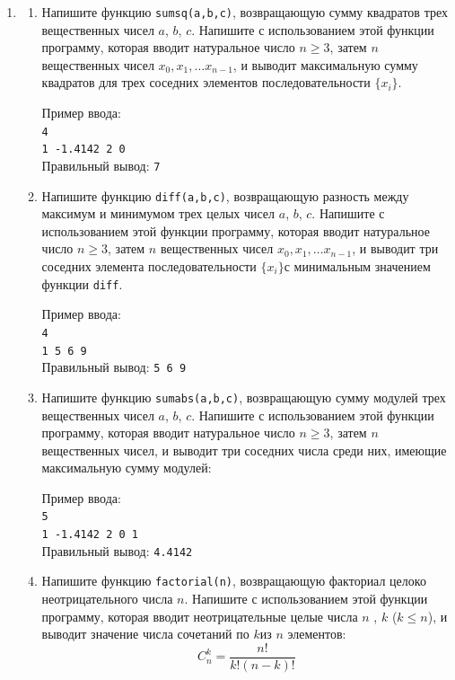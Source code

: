 \documentclass{article}
\newcommand{\textex}[1]{\texttt{\color{ForestGreen}#1}}
\begin{document}
\begin{enumerate}[label={}, leftmargin=0pt, itemindent=0pt]

\item

\begin{enumerate}[label=\arabic{enumi}.\arabic*.] %
\item
Напишите функцию \texttt{sumsq(a,b,c)}, возвращающую сумму квадратов трех вещественных чисел $a$, $b$, $c$. Напишите с использованием этой функции программу, которая вводит натуральное число $n\geqslant 3$, затем $n$ вещественных чисел $x_0, x_1, \ldots x_{n-1}$, и выводит максимальную сумму квадратов для трех соседних элементов последовательности $\{x_i\}$.

\noindent Пример ввода: \\
\textex{4\\
1 -1.4142 2 0}\\
Правильный вывод: \textex{7}

\item
Напишите функцию \texttt{diff(a,b,c)}, возвращающую разность между максимум и минимумом трех целых чисел $a$, $b$, $c$. Напишите с использованием этой функции программу, которая вводит натуральное число $n\geqslant 3$, затем $n$ вещественных чисел $x_0, x_1, \ldots x_{n-1}$, и выводит три соседних элемента последовательности $\{x_i\}$с минимальным значением функции \texttt{diff}.

\noindent Пример ввода: \\
\textex{4\\
1 5 6 9}\\
Правильный вывод: \textex{5 6 9}

\item
Напишите функцию \texttt{sumabs(a,b,c)}, возвращающую сумму модулей трех вещественных чисел $a$, $b$, $c$. Напишите с использованием этой функции программу, которая вводит натуральное число $n\geqslant 3$, затем $n$ вещественных чисел, и выводит три соседних числа среди них, имеющие максимальную сумму модулей:

\noindent Пример ввода: \\
\textex{5\\
1 -1.4142 2 0 1}\\
Правильный вывод: \textex{4.4142}

\item
Напишите функцию \texttt{factorial(n)}, возвращающую факториал целоко неотрицательного числа $n$. Напишите с использованием этой функции программу, которая вводит неотрицательные целые числа $n$ , $k$  ($k\leqslant n$), и выводит значение числа сочетаний по $k$из $n$ элементов: $$C_n^k = \frac{n!}{k!(n-k)!}$$


\end{enumerate}
\end{enumerate}
\end{document}
